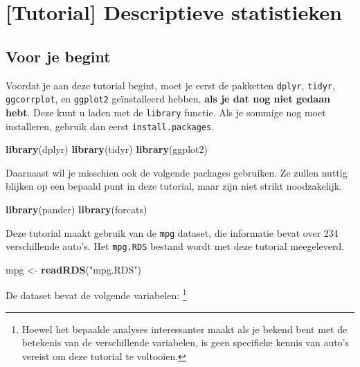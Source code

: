 \documentclass[]{tufte-book}
\newenvironment{Shaded}{}{}
\newcommand{\KeywordTok}[1]{\textcolor[rgb]{0.00,0.44,0.13}{\textbf{#1}}}
\newcommand{\NormalTok}[1]{#1}
\newcommand{\StringTok}[1]{\textcolor[rgb]{0.25,0.44,0.63}{#1}}
\begin{document}
\hypertarget{tutorial-descriptieve-statistieken}{%
\chapter{{[}Tutorial{]} Descriptieve statistieken}\label{tutorial-descriptieve-statistieken}}

\hypertarget{voor-je-begint-1}{%
\section{Voor je begint}\label{voor-je-begint-1}}

Voordat je aan deze tutorial begint, moet je eerst de pakketten \texttt{dplyr}, \texttt{tidyr}, \texttt{ggcorrplot}, en \texttt{ggplot2} geïnstalleerd hebben, \textbf{als je dat nog niet gedaan hebt}. Deze kunt u laden met de \texttt{library} functie. Als je sommige nog moet installeren, gebruik dan eerst \texttt{install.packages}.

\begin{Shaded}
\begin{Highlighting}[]
\KeywordTok{library}\NormalTok{(dplyr)}
\KeywordTok{library}\NormalTok{(tidyr)}
\KeywordTok{library}\NormalTok{(ggplot2)}
\end{Highlighting}
\end{Shaded}

Daarnaast wil je misschien ook de volgende packages gebruiken. Ze zullen nuttig blijken op een bepaald punt in deze tutorial, maar zijn niet strikt noodzakelijk.

\begin{Shaded}
\begin{Highlighting}[]
\KeywordTok{library}\NormalTok{(pander)}
\KeywordTok{library}\NormalTok{(forcats)}
\end{Highlighting}
\end{Shaded}

Deze tutorial maakt gebruik van de \texttt{mpg} dataset, die informatie bevat over 234 verschillende auto's. Het \texttt{mpg.RDS} bestand wordt met deze tutorial meegeleverd.

\begin{Shaded}
\begin{Highlighting}[]
\NormalTok{mpg <-}\StringTok{ }\KeywordTok{readRDS}\NormalTok{(}\StringTok{"mpg.RDS"}\NormalTok{)}
\end{Highlighting}
\end{Shaded}

De dataset bevat de volgende variabelen: \footnote{Hoewel het bepaalde analyses interessanter maakt als je bekend bent met de betekenis van de verschillende variabelen, is geen specifieke kennis van auto's vereist om deze tutorial te voltooien.}
\end{document}
